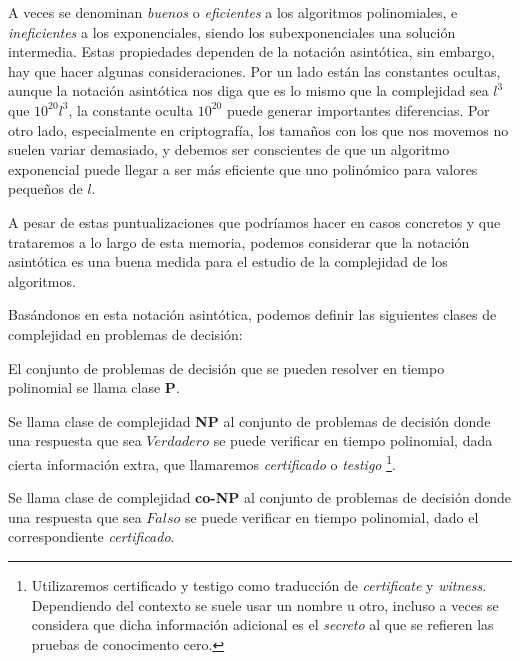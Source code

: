 A veces se denominan \textit{buenos} o \textit{eficientes} a los algoritmos polinomiales, e \textit{ineficientes} a los exponenciales, siendo los subexponenciales una soluci\'on intermedia.
Estas propiedades dependen de la notaci\'on asint\'otica, sin embargo, hay que hacer algunas consideraciones. Por un lado est\'an las
constantes ocultas, aunque la notaci\'on asint\'otica nos diga que es lo mismo que la complejidad sea $l^3$ que $10^{20} l^3$, la constante oculta $10^{20}$
puede generar importantes diferencias. Por otro lado, especialmente en criptograf\'ia, los tama\~nos con los que nos movemos no
suelen variar demasiado, y debemos ser conscientes de que un algoritmo exponencial puede llegar a ser m\'as eficiente que uno polin\'omico para valores peque\~nos de $l$.

A pesar de estas puntualizaciones que podr\'iamos hacer en casos concretos y que trataremos a lo largo de esta memoria, podemos considerar que la
notaci\'on asint\'otica es una buena medida para el estudio de la complejidad de los algoritmos.

Bas\'andonos en esta notaci\'on asint\'otica, podemos definir las siguientes clases de complejidad en problemas de decisi\'on:

\begin{definition}
	El conjunto de problemas de decisión que se pueden resolver en tiempo polinomial se llama clase \textbf{P}.
\end{definition}

\begin{definition}
	\label{def:NP}
	Se llama clase de complejidad \textbf{NP} al conjunto de problemas de decisión
	donde una respuesta que sea $Verdadero$ se puede verificar en tiempo polinomial,
	dada cierta información extra, que llamaremos {\em certificado} o {\em testigo}
	\footnote{Utilizaremos certificado y testigo como traducci\'on de {\em certificate} y {\em witness}.
	Dependiendo del contexto se suele usar un nombre u otro, incluso a veces se considera
	que dicha informaci\'on adicional es el {\em secreto} al que se refieren las pruebas
	de conocimento cero.}.
\end{definition}

\begin{definition}
	Se llama clase de complejidad \textbf{co-NP} al conjunto de problemas de decisión
	donde una respuesta que sea $Falso$ se puede verificar en tiempo polinomial,
	dado el correspondiente \textit{certificado}.
\end{definition}

